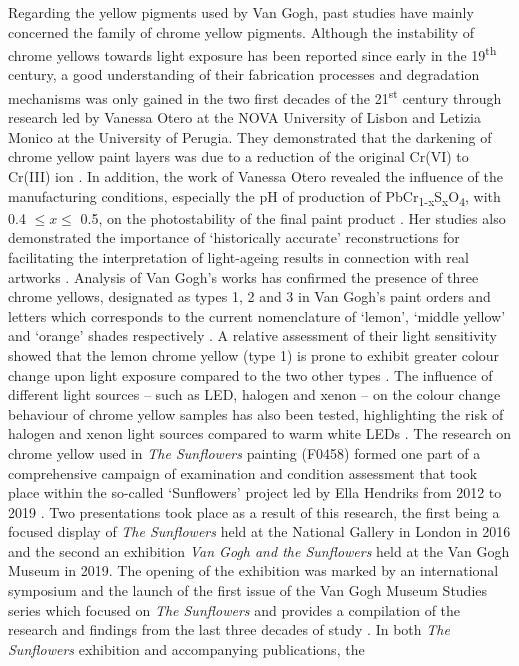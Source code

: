 Regarding the yellow pigments used by Van Gogh, past studies have mainly concerned the family of chrome yellow pigments. Although the instability of chrome yellows towards light exposure has been reported since early in the 19\textsuperscript{th} century, a good understanding of their fabrication processes and degradation mechanisms was only gained in the two first decades of the 21\textsuperscript{st} century through research led by Vanessa Otero at the NOVA University of Lisbon and Letizia Monico at the University of Perugia. They demonstrated that the darkening of chrome yellow paint layers was due to a reduction of the original Cr(VI) to Cr(III) ion \citep{monico_degradation_2011,monico_degradation_2011-1}. In addition, the work of Vanessa Otero revealed the influence of the manufacturing conditions, especially the pH of production of PbCr\textsubscript{1-x}S\textsubscript{x}O\textsubscript{4}, with 0.4 $\leq x \leq$ 0.5, on the photostability of the final paint product \citep[Chapter 4]{otero_historically_2018}. Her studies also demonstrated the importance of ‘historically accurate’ reconstructions for facilitating the interpretation of light-ageing results in connection with real artworks \citep{otero_nineteenth_2017}. Analysis of Van Gogh's works has confirmed the presence of three chrome yellows, designated as types 1, 2 and 3 in Van Gogh's paint orders and letters which corresponds to the current nomenclature of ‘lemon’, ‘middle yellow’ and ‘orange’ shades respectively \citep{monico_degradation_2013}. A relative assessment of their light sensitivity showed that the lemon chrome yellow (type 1) is prone to exhibit greater colour change upon light exposure compared to the two other types \citep{monico_degradation_2013-1}. The influence of different light sources – such as \gls{LED}, halogen and xenon – on the colour change behaviour of chrome yellow samples has also been tested, highlighting the risk of halogen and xenon light sources compared to warm white LEDs \citep[149–54]{monico_chemical_2019}. The research on chrome yellow used in \textit{The Sunflowers} painting (F0458) formed one part of a comprehensive campaign of examination and condition assessment that took place within the so-called ‘Sunflowers’ project led by Ella Hendriks from 2012 to 2019 \citep{hendriks_van_2019-1}. Two presentations took place as a result of this research, the first being a focused display of \textit{The Sunflowers} held at the National Gallery in London in 2016 \citep{ashok_van_2016} and the second an exhibition \textit{Van Gogh and the Sunflowers} held at the Van Gogh Museum in 2019. The opening of the exhibition was marked by an international symposium and the launch of the first issue of the Van Gogh Museum Studies series which focused on \textit{The Sunflowers} and provides a compilation of the research and findings from the last three decades of study \citep{hendriks_van_2019}. In both \textit{The Sunflowers} exhibition and accompanying publications, the 